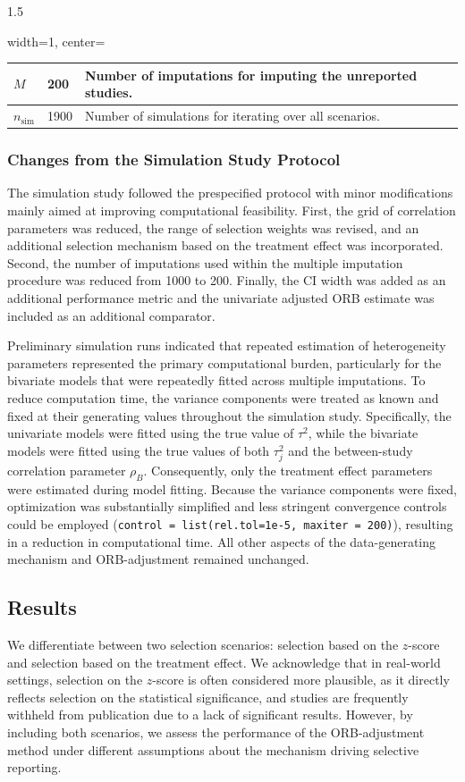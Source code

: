 \documentclass{article}
\begin{document}
\begin{spacing}{1.5}
\begin{table}[]
\begin{adjustbox}{width=1\textwidth, center=\textwidth}
\begin{tabular}{|l|l|l|}
$M$    & 200  & Number of imputations for imputing the unreported studies.    \\ \hline
$n_{\text{sim}}$    & 1900  & Number of simulations for iterating over all scenarios.    \\ \hline
\end{tabular}
\end{adjustbox}
\end{table}

\subsubsection{Changes from the Simulation Study Protocol}
The simulation study followed the prespecified protocol with minor modifications mainly aimed at improving computational feasibility. First, the grid of correlation parameters was reduced, the range of selection weights was revised, and an additional selection mechanism based on the treatment effect was incorporated. Second, the number of imputations used within the multiple imputation procedure was reduced from 1000 to 200. Finally, the CI width was added as an additional performance metric and the univariate adjusted ORB estimate was included as an additional comparator. 

Preliminary simulation runs indicated that repeated estimation of heterogeneity parameters represented the primary computational burden, particularly for the bivariate models that were repeatedly fitted across multiple imputations. To reduce computation time, the variance components were treated as known and fixed at their generating values throughout the simulation study. Specifically, the univariate models were fitted using the true value of $\tau^2$, while the bivariate models were fitted using the true values of both $\tau_j^2$ and the between-study correlation parameter $\rho_B$. Consequently, only the treatment effect parameters were estimated during model fitting. Because the variance components were fixed, optimization was substantially simplified and less stringent convergence controls could be employed (\texttt{control = list(rel.tol=1e-5, maxiter = 200)}), resulting in a reduction in computational time. All other aspects of the data-generating mechanism and ORB-adjustment remained unchanged.

\subsection{Results}

We differentiate between two selection scenarios: selection based on the $z$-score and selection based on the treatment effect. We acknowledge that in real-world settings, selection on the $z$-score is often considered more plausible, as it directly reflects selection on the statistical significance, and studies are frequently withheld from publication due to a lack of significant results. However, by including both scenarios, we assess the performance of the ORB-adjustment method under different assumptions about the mechanism driving selective reporting. 


\end{spacing}
\end{document}
